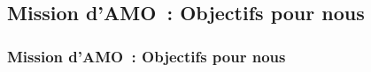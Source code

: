 \subsection{Mission d'AMO~: Objectifs pour nous}
\begin{frame}
	\frametitle{Mission d'AMO~: Objectifs pour nous}
\end{frame}

